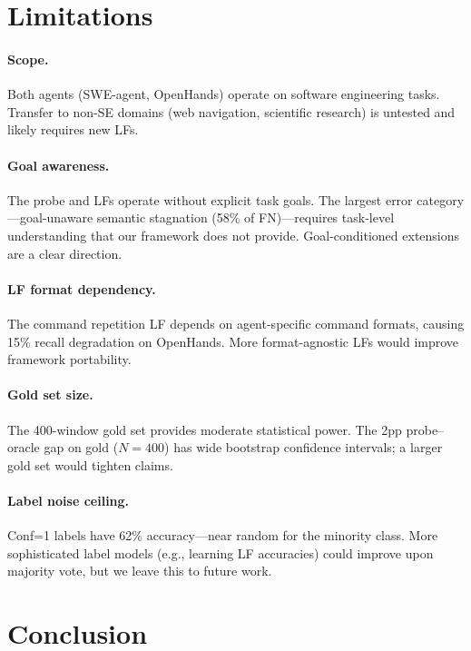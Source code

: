 \documentclass[11pt]{article}
\begin{document}
\section{Limitations}
\label{sec:limitations}

\paragraph{Scope.} Both agents (SWE-agent, OpenHands) operate on software engineering tasks. Transfer to non-SE domains (web navigation, scientific research) is untested and likely requires new LFs.

\paragraph{Goal awareness.} The probe and LFs operate without explicit task goals. The largest error category---goal-unaware semantic stagnation (58\% of FN)---requires task-level understanding that our framework does not provide. Goal-conditioned extensions are a clear direction.

\paragraph{LF format dependency.} The command repetition LF depends on agent-specific command formats, causing 15\% recall degradation on OpenHands. More format-agnostic LFs would improve framework portability.

\paragraph{Gold set size.} The 400-window gold set provides moderate statistical power. The 2pp probe--oracle gap on gold ($N{=}400$) has wide bootstrap confidence intervals; a larger gold set would tighten claims.

\paragraph{Label noise ceiling.} Conf=1 labels have 62\% accuracy---near random for the minority class. More sophisticated label models (e.g., learning LF accuracies) could improve upon majority vote, but we leave this to future work.

\section{Conclusion}
\label{sec:conclusion}
\end{document}
